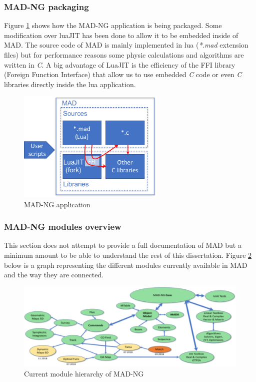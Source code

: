 \subsubsection{MAD-NG packaging}
\label{Subsec:mad-pk}

Figure \ref{fig:mad} shows how the MAD-NG application is being packaged. Some
modification over luaJIT has been done to allow it to be embedded inside of MAD.
The source code of MAD is mainly implemented in lua (\emph{*.mad} extension
files) but for performance reasons some physic calculations and algorithms are
written in \emph{C}. A big advantage of LuaJIT is the efficiency of the FFI
library (Foreign Function Interface) that allow us to use embedded \emph{C} code
or even \emph{C} libraries directly inside the lua application.

\begin{figure}[H]
    \centering
	\includegraphics[width=7cm]{./Images/MAD.pdf}
    \caption{MAD-NG application}
    \label{fig:mad}
\end{figure}

\subsubsection{MAD-NG modules overview}
\label{Subsec:mad-doc}

This section does not attempt to provide a full documentation of MAD but a
minimum amount to be able to understand the rest of this dissertation.
Figure \ref{fig:mad-graph} below is a graph representing the different
modules currently available in MAD and the way they are connected.

\begin{figure}[H]
    \centering
	\includegraphics[width=\textwidth]{./Images/mad-graph.pdf}
    \caption{Current module hierarchy of MAD-NG}
    \label{fig:mad-graph}
\end{figure}

